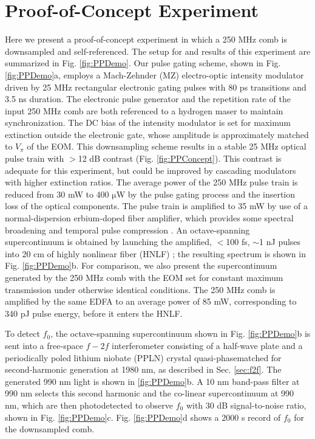 \section{Proof-of-Concept Experiment}\label{sec:PPProofOfPrinciple}
Here we present a proof-of-concept experiment in which a 250 MHz comb is downsampled and self-referenced. The setup for and results of this experiment are summarized in Fig. \ref{fig:PPDemo}. Our pulse gating scheme, shown in Fig. \ref{fig:PPDemo}a, employs a Mach-Zehnder (MZ) electro-optic intensity modulator driven by 25 MHz rectangular electronic gating pulses with 80 ps transitions and 3.5 ns duration. The electronic pulse generator and the repetition rate of the input 250 MHz comb are both referenced to a hydrogen maser to maintain synchronization. The DC bias of the intensity modulator is set for maximum extinction outside the electronic gate, whose amplitude is approximately matched to $V_\pi$ of the EOM. This downsampling scheme results in a stable 25 MHz optical pulse train with $>$12 dB contrast (Fig. \ref{fig:PPConcept}). This contrast is adequate for this experiment, but could be improved by cascading modulators with higher extinction ratios.  The average power of the 250 MHz pulse train is reduced from 30 mW to 400 $\mathrm{\mu}$W by the pulse gating process and the insertion loss of the optical components. The pulse train is amplified to 35 mW by use of a normal-dispersion erbium-doped fiber amplifier, which provides some spectral broadening and temporal pulse compression \cite{Fermann2000}. An octave-spanning supercontinuum is obtained by launching the amplified, $<$100 fs, $\sim$1 nJ pulses into 20 cm of highly nonlinear fiber (HNLF) \cite{Hirano2009}; the resulting spectrum is shown in Fig. \ref{fig:PPDemo}b.  For comparison, we also present the supercontinuum generated by the 250 MHz comb with the EOM set for constant maximum transmission under otherwise identical conditions. The 250 MHz comb is amplified by the same EDFA to an average power of 85 mW, corresponding to 340 pJ pulse energy, before it enters the HNLF.

To detect $f_0$, the octave-spanning supercontinuum shown in Fig. \ref{fig:PPDemo}b is sent into a free-space $f-2f$ interferometer consisting of a half-wave plate and a periodically poled lithium niobate (PPLN) crystal quasi-phasematched for second-harmonic generation at 1980 nm, as described in Sec. \ref{sec:f2f}. The generated 990 nm light is shown in \ref{fig:PPDemo}b. A 10 nm band-pass filter at 990 nm selects this second harmonic and the co-linear supercontinuum at 990 nm, which are then photodetected to observe $f_0$ with 30 dB signal-to-noise ratio, shown in Fig. \ref{fig:PPDemo}c. Fig. \ref{fig:PPDemo}d shows a 2000 s record of $f_0$ for the downsampled comb.




